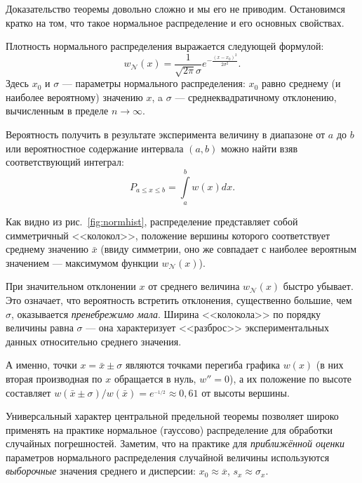 Доказательство теоремы довольно сложно и мы его не приводим. Остановимся
кратко на том, что такое нормальное распределение и его основных свойствах.

Плотность нормального распределения выражается следующей формулой:
\begin{equation}
    \label{eq:normal}
    \boxed{
        w_{\mathcal{N}}\!\left(x\right)=\frac{1}{\sqrt{2\pi}\sigma}e^{-\tfrac{(x-x_{0})^{2}}{2\sigma^{2}}}
    }.
\end{equation}
Здесь $x_{0}$ и $\sigma$
--- параметры нормального распределения: $x_{0}$ равно
среднему (и наиболее вероятному) значению $x$, a $\sigma$ ---
среднеквадратичному отклонению, вычисленным в пределе $n\to\infty$. 

Вероятность получить в результате эксперимента величину в диапазоне от $a$ до $b$ или вероятностное содержание интервала $(a,b)$ можно найти взяв соответствующий интеграл:
\begin{equation}
    P_{a\le x\le b}=\int\limits _{a}^{b}w\!\left(x\right)dx.\label{eq:P}
\end{equation}

Как видно из рис.~\ref{fig:normhist}, распределение представляет собой симметричный
<<колокол>>, положение вершины которого
соответствует среднему значению $\bar{x}$ (ввиду симметрии, оно же
совпадает с наиболее вероятным значением --- максимумом
функции $w_{\mathcal{N}}(x)$).

%     


При значительном отклонении $x$ от среднего величина $w_{\mathcal{N}}\!\left(x\right)$
быстро убывает. Это означает, что вероятность встретить отклонения,
существенно большие, чем $\sigma$, оказывается \emph{пренебрежимо
мала}. Ширина <<колокола>> по порядку величины
равна $\sigma$ --- она характеризует <<разброс>>
экспериментальных данных относительно среднего значения.

{\footnotesize{}А именно, точки $x=\bar{x}\pm\sigma$ являются точками
перегиба графика $w\left(x\right)$ (в них вторая производная по $x$
обращается в нуль, $w''=0$), а их положение по высоте составляет
$w\!\left(\bar{x}\pm\sigma\right)/w(\bar{x})=e^{_{-1/2}}\approx0{,}61$
от высоты вершины.}{\footnotesize\par}

Универсальный характер центральной предельной теоремы позволяет широко
применять на практике нормальное (гауссово) распределение для обработки
случайных погрешностей. Заметим, что на практике для \emph{приближённой
оценки} параметров нормального распределения случайной величины используются
\emph{выборочные} значения среднего и дисперсии: $x_{0}\approx\overline{x}$,
$s_{x}\approx\sigma_{x}$.

